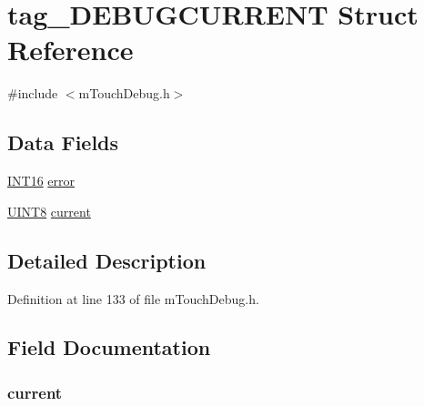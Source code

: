 \hypertarget{structtag___d_e_b_u_g_c_u_r_r_e_n_t}{}\section{tag\+\_\+\+D\+E\+B\+U\+G\+C\+U\+R\+R\+E\+N\+T Struct Reference}
\label{structtag___d_e_b_u_g_c_u_r_r_e_n_t}


{\ttfamily \#include $<$m\+Touch\+Debug.\+h$>$}

\subsection*{Data Fields}
\begin{DoxyCompactItemize}
\item 
\hyperlink{_generic_type_defs_8h_ad87465075f24df28ef66f25e43f0bd5a}{I\+N\+T16} \hyperlink{structtag___d_e_b_u_g_c_u_r_r_e_n_t_a2c336ec489f664295b2020b126f23ed4}{error}
\item 
\hyperlink{_generic_type_defs_8h_ab27e9918b538ce9d8ca692479b375b6a}{U\+I\+N\+T8} \hyperlink{structtag___d_e_b_u_g_c_u_r_r_e_n_t_a99c1e2866959e2dff8f5b15b8b306974}{current}
\end{DoxyCompactItemize}


\subsection{Detailed Description}


Definition at line 133 of file m\+Touch\+Debug.\+h.



\subsection{Field Documentation}
\hypertarget{structtag___d_e_b_u_g_c_u_r_r_e_n_t_a99c1e2866959e2dff8f5b15b8b306974}{}
\subsubsection[{current}]{ current}\label{structtag___d_e_b_u_g_c_u_r_r_e_n_t_a99c1e2866959e2dff8f5b15b8b306974}


